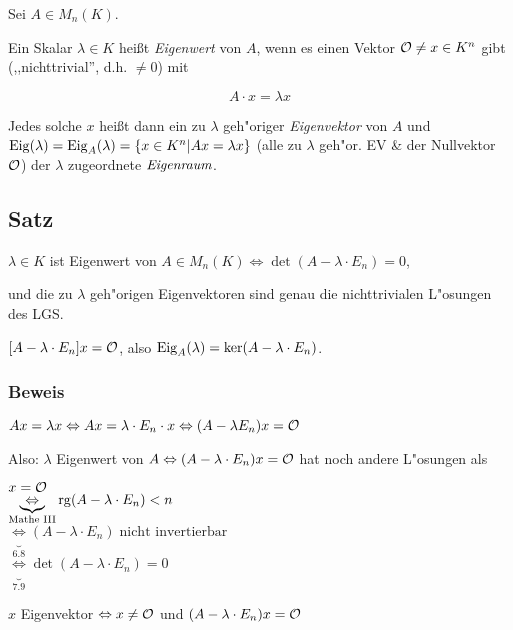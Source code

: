 Sei $A \in M_n(K)$.

Ein Skalar $\lambda \in K$ heißt \emph{Eigenwert} von $A$, wenn es einen Vektor $\mathcal{O} \neq x \in K^n$ gibt (,,nichttrivial'', d.h. $\neq 0$) mit

\[A\cdot x = \lambda x\]

Jedes solche $x$ heißt dann ein zu $\lambda$ geh"origer \emph{Eigenvektor} von $A$ und $\mathrm{ Eig }(\lambda)=\mathrm{ Eig }_A(\lambda)=\{x \in K^n | Ax=\lambda x \}$ (alle zu $\lambda$ geh"or. EV \& der Nullvektor $\mathcal{O}$) der $\lambda$ zugeordnete $\emph{Eigenraum}$.

\subsection{Satz}

$\lambda \in K$ ist Eigenwert von $A \in M_n(K) \Leftrightarrow \det(A-\lambda \cdot E_n) = 0$,

und die zu $\lambda$ geh"origen Eigenvektoren sind genau die nichttrivialen L"osungen des LGS.

$[A - \lambda \cdot E_n] x = \mathcal{O}$, also $\mathrm{ Eig }_A(\lambda) = \ker(A- \lambda \cdot E_n)$.

\subsubsection*{Beweis}

$Ax = \lambda x \Leftrightarrow Ax = \lambda \cdot E_n \cdot x \Leftrightarrow (A - \lambda E_n) x = \mathcal{O}$

Also: $\lambda$ Eigenwert von $A \Leftrightarrow (A- \lambda \cdot E_n)x = \mathcal{O}$ hat noch andere L"osungen als 

$x = \mathcal{O}$\\
$\underbrace{\Leftrightarrow}_{\text{Mathe III}} \mathrm{ rg }(A-\lambda \cdot E_n) < n$\\
$\underbrace{\Leftrightarrow}_{6.8}(A-\lambda \cdot E_n) \; \text{nicht invertierbar}$\\
$\underbrace{\Leftrightarrow}_{7.9}\det(A-\lambda \cdot E_n) = 0$

$x$ Eigenvektor $\Leftrightarrow x \neq \mathcal{O}$ und $(A- \lambda \cdot E_n) x = \mathcal{O}$


